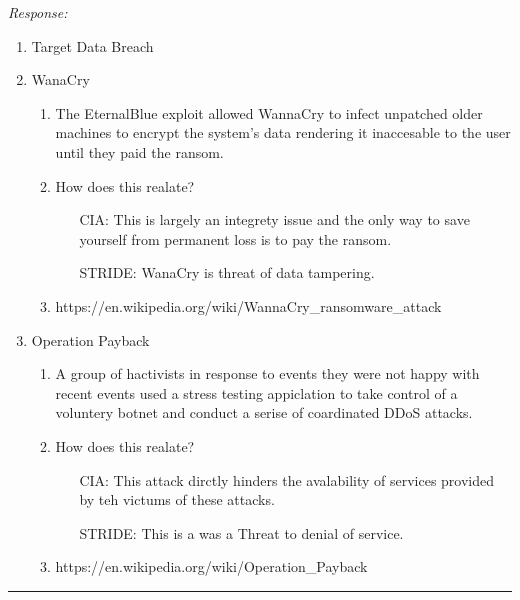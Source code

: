 \documentclass[a4paper, 11pt]{article}
\newenvironment{response}
                {\textit{Response:}}
                {}
\begin{document}
 \begin{response}
   \begin{enumerate}[label=\arabic*)]
   \item Target Data Breach 
   \item WanaCry
     \begin{enumerate}[label=\alpha*.]
     \item The EternalBlue exploit allowed WannaCry to infect unpatched older machines to encrypt the system's data rendering it inaccesable to the user until they paid the ransom.
     \item How does this realate?
       \begin{itemize}
       \item[CIA:] This is largely an integrety issue and the only way to save yourself from permanent loss is to pay the ransom.
       \item[STRIDE:] WanaCry is threat of data tampering.
       \end{itemize}
     \item https://en.wikipedia.org/wiki/WannaCry_ransomware_attack
     \end{enumerate}
   \item Operation Payback
     \begin{enumerate}[label=\alpha*.]
     \item A group of hactivists in response to events they were not happy with recent events used a stress testing appiclation to take control of a voluntery botnet and conduct a serise of coardinated DDoS attacks.
     \item How does this realate?
       \begin{itemize}
       \item[CIA:] This attack dirctly hinders the avalability of services provided by teh victums of these attacks.
       \item[STRIDE:] This is a was a Threat to denial of service.
       \end{itemize}
     \item https://en.wikipedia.org/wiki/Operation_Payback
     \end{enumerate}
   \end{enumerate}

 \end{response}
 \noindent\rule{7in}{2.8pt}
\end{document}
